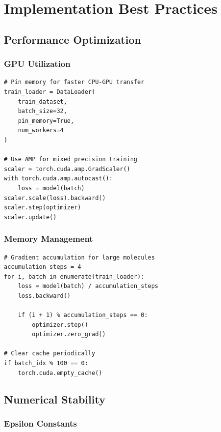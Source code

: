 \documentclass[11pt,a4paper]{article}
\begin{document}
\clearpage

\section{Implementation Best Practices}

\subsection{Performance Optimization}

\subsubsection{GPU Utilization}

\begin{lstlisting}
# Pin memory for faster CPU-GPU transfer
train_loader = DataLoader(
    train_dataset,
    batch_size=32,
    pin_memory=True,
    num_workers=4
)

# Use AMP for mixed precision training
scaler = torch.cuda.amp.GradScaler()
with torch.cuda.amp.autocast():
    loss = model(batch)
scaler.scale(loss).backward()
scaler.step(optimizer)
scaler.update()
\end{lstlisting}

\subsubsection{Memory Management}

\begin{lstlisting}
# Gradient accumulation for large molecules
accumulation_steps = 4
for i, batch in enumerate(train_loader):
    loss = model(batch) / accumulation_steps
    loss.backward()

    if (i + 1) % accumulation_steps == 0:
        optimizer.step()
        optimizer.zero_grad()

# Clear cache periodically
if batch_idx % 100 == 0:
    torch.cuda.empty_cache()
\end{lstlisting}

\subsection{Numerical Stability}

\subsubsection{Epsilon Constants}
\end{document}

